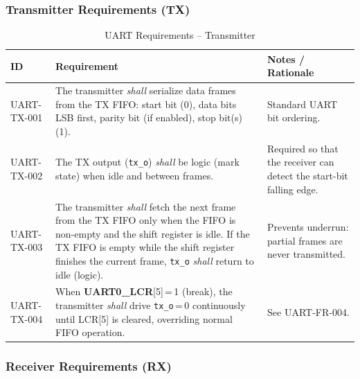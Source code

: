 \subsubsection{Transmitter Requirements (TX)}

\begin{table}[H]
\caption{UART Requirements -- Transmitter}
\label{tab:asUartReqTX}
\centering
\begin{tabularx}{\textwidth}{|l |X |X|}
  \hline
  ID & Requirement & Notes / Rationale \\
  \hline
  \hline
  UART-TX-001 &
    The transmitter \textit{shall} serialize data frames from the TX FIFO:
    start bit (0), data bits LSB first, parity bit (if enabled), stop
    bit(s) (1). &
    Standard UART bit ordering. \\
  \hline
  UART-TX-002 &
    The TX output (\texttt{tx\_o}) \textit{shall} be logic\;1 (mark state)
    when idle and between frames. &
    Required so that the receiver can detect the start-bit falling edge. \\
  \hline
  UART-TX-003 &
    The transmitter \textit{shall} fetch the next frame from the TX FIFO
    only when the FIFO is non-empty and the shift register is idle.
    If the TX FIFO is empty while the shift register finishes the current
    frame, \texttt{tx\_o} \textit{shall} return to idle (logic\;1). &
    Prevents underrun: partial frames are never transmitted. \\
  \hline
  UART-TX-004 &
    When \textbf{UART0\_LCR}[5]\,=\,1 (break), the transmitter
    \textit{shall} drive \texttt{tx\_o}\,=\,0 continuously until
    LCR[5] is cleared, overriding normal FIFO operation. &
    See UART-FR-004. \\
  \hline
\end{tabularx}
\end{table}

\subsubsection{Receiver Requirements (RX)}

